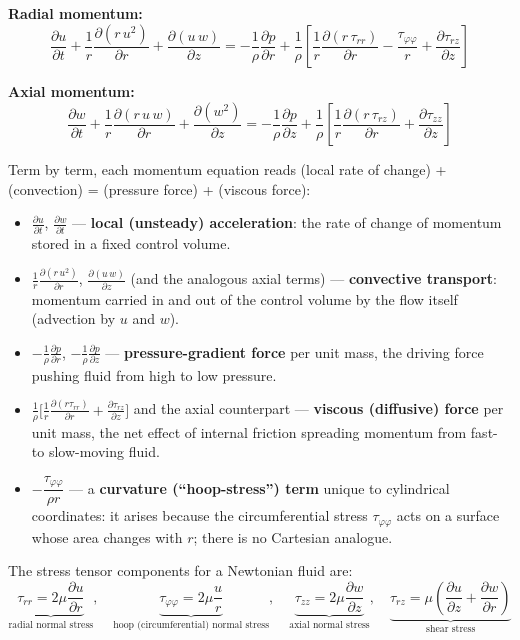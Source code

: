 \documentclass[12pt,a4paper]{article}
\newcommand{\parder}[2]{\frac{\partial #1}{\partial #2}}
\begin{document}
\textbf{Radial momentum:}
\begin{equation}
    \parder{u}{t} + \frac{1}{r}\parder{(r\,u^2)}{r} + \parder{(u\,w)}{z}
    = -\frac{1}{\rho}\parder{p}{r}
      + \frac{1}{\rho}\left[\frac{1}{r}\parder{(r\,\tau_{rr})}{r} - \frac{\tau_{\varphi\varphi}}{r} + \parder{\tau_{rz}}{z}\right]
    \label{eq:momentum_r_dim}
\end{equation}

\textbf{Axial momentum:}
\begin{equation}
    \parder{w}{t} + \frac{1}{r}\parder{(r\,u\,w)}{r} + \parder{(w^2)}{z}
    = -\frac{1}{\rho}\parder{p}{z}
      + \frac{1}{\rho}\left[\frac{1}{r}\parder{(r\,\tau_{rz})}{r} + \parder{\tau_{zz}}{z}\right]
    \label{eq:momentum_z_dim}
\end{equation}

Term by term, each momentum equation reads (local rate of change) + (convection)
= (pressure force) + (viscous force):
\begin{itemize}
    \item $\parder{u}{t}$, $\parder{w}{t}$ --- \textbf{local (unsteady) acceleration}: the rate of
          change of momentum stored in a fixed control volume.
    \item $\frac{1}{r}\parder{(r\,u^2)}{r}$, $\parder{(u\,w)}{z}$ (and the analogous axial terms)
          --- \textbf{convective transport}: momentum carried in and out of the control volume by
          the flow itself (advection by $u$ and $w$).
    \item $-\frac{1}{\rho}\parder{p}{r}$, $-\frac{1}{\rho}\parder{p}{z}$ --- \textbf{pressure-gradient
          force} per unit mass, the driving force pushing fluid from high to low pressure.
    \item $\frac{1}{\rho}\big[\frac1r\parder{(r\tau_{rr})}{r}+\parder{\tau_{rz}}{z}\big]$ and the
          axial counterpart --- \textbf{viscous (diffusive) force} per unit mass, the net effect
          of internal friction spreading momentum from fast- to slow-moving fluid.
    \item $-\dfrac{\tau_{\varphi\varphi}}{\rho r}$ --- a \textbf{curvature (``hoop-stress'') term}
          unique to cylindrical coordinates: it arises because the circumferential stress
          $\tau_{\varphi\varphi}$ acts on a surface whose area changes with $r$; there is no
          Cartesian analogue.
\end{itemize}

The stress tensor components for a Newtonian fluid are:
\begin{equation}
    \underbrace{\tau_{rr} = 2\mu\parder{u}{r}}_{\text{radial normal stress}}, \quad
    \underbrace{\tau_{\varphi\varphi} = 2\mu\frac{u}{r}}_{\text{hoop (circumferential) normal stress}}, \quad
    \underbrace{\tau_{zz} = 2\mu\parder{w}{z}}_{\text{axial normal stress}}, \quad
    \underbrace{\tau_{rz} = \mu\left(\parder{u}{z} + \parder{w}{r}\right)}_{\text{shear stress}}
\end{equation}
\end{document}
